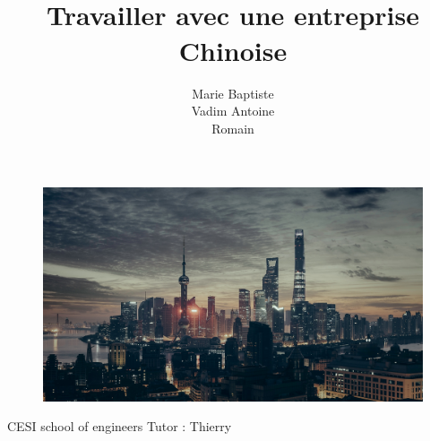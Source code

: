 \documentclass{article}
\begin{document}
\begin{titlepage}
\begin{figure}
\end{figure}

\title{ \\ \vspace{2cm} \bf{\color{title-color}\robotoslab Travailler avec une entreprise Chinoise} \vspace{1cm} \\
}
\begin{figure}
\begin{center}
\includegraphics[scale = 0.1]{Img/china-illustration.jpg}
\end{center}
\end{figure}
\author{\Large{Marie } \Large{Baptiste  } \\\Large{Vadim  } \Large{Antoine  } \\\Large{Romain  }}
\date{}
\vfill 
\end{titlepage}
\maketitle
\vspace{5.5cm}
\Large{CESI school of engineers} \hfill \Large{Tutor : Thierry }
\thispagestyle{empty}
\setcounter{page}{0}
\newpage

\renewcommand{\contentsname}{Table of contents}
\tableofcontents

\newpage

\newcommand{\projectname}{ChineseTooth\xspace}
\newcommand{\companyname}{Cesi conseil\xspace}
\newcommand{\moldco}{MOLD \& Co.\xspace}
\end{document}
